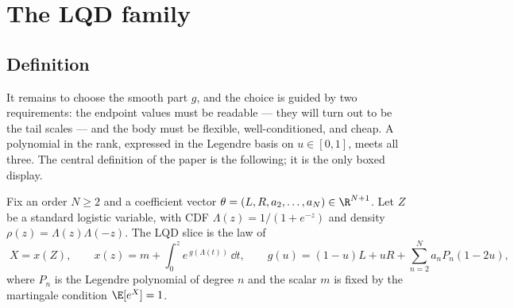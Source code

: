 \section{The LQD family}
\label{sec:model}

\subsection{Definition}

It remains to choose the smooth part $g$, and the choice is guided by two
requirements: the endpoint values must be readable --- they will turn out
to be the tail scales --- and the body must be flexible, well-conditioned,
and cheap.  A polynomial in the rank, expressed in the Legendre basis on
$u\in[0,1]$, meets all three.  The central definition of the paper is the
following; it is the only boxed display.

\begin{definition}
\label{def:lqd}
Fix an order $N\ge2$ and a coefficient vector
$\theta=(L,R,a_2,\dots,a_N)\in\R^{N+1}$.  Let $Z$ be a standard logistic
variable, with CDF $\Lambda(z)=1/(1+e^{-z})$ and density
$\rho(z)=\Lambda(z)\Lambda(-z)$.  The LQD slice is the law of
\begin{equation}
\boxed{\;
X=x(Z),\qquad
x(z)=m+\int_{0}^{z}e^{\,g(\Lambda(t))}\,\dd t,\qquad
g(u)=(1-u)L+uR+\sum_{n=2}^{N}a_n P_n(1-2u),
\;}
\label{eq:lqd}
\end{equation}
where $P_n$ is the Legendre polynomial of degree $n$ and the scalar $m$ is
fixed by the martingale condition $\E[e^{X}]=1$.
\end{definition}


